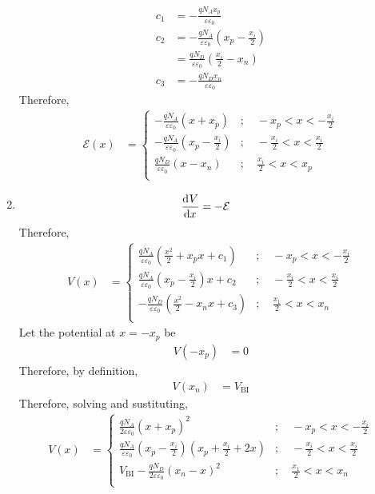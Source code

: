 \documentclass[titlepage, fleqn, a4paper, 12pt, twoside]{article}
\theoremstyle{definition}
\theoremstyle{theorem}
\begin{document}
\begin{solution}
\begin{enumerate}[leftmargin=*]
\begin{align*}
				c_1 &= -\frac{q N_A x_p}{\varepsilon \varepsilon_0}\\
				c_2 &= -\frac{q N_A}{\varepsilon \varepsilon_0} \left( x_p - \frac{x_i}{2} \right)\\
				&= \frac{q N_D}{\varepsilon \varepsilon_0} \left( \frac{x_i}{2} - x_n \right)\\
				c_3 &= -\frac{q N_D x_n}{\varepsilon \varepsilon_0}
			\end{align*}
			Therefore,
			\begin{align*}
				\mathcal{E}(x) &=
					\begin{cases}
						-\frac{q N_A}{\varepsilon \varepsilon_0} (x + x_p) &;\quad -x_p < x < -\frac{x_i}{2}\\
						-\frac{q N_A}{\varepsilon \varepsilon_0} \left( x_p - \frac{x_i}{2} \right) &;\quad -\frac{x_i}{2} < x < \frac{x_i}{2}\\
						\frac{q N_D}{\varepsilon \varepsilon_0} (x - x_n) &;\quad \frac{x_i}{2} < x < x_p\\
					\end{cases}
			\end{align*}
		\item
			\begin{align*}
				\dod{V}{x} &= -\mathcal{E}
			\end{align*}
			Therefore,
			\begin{align*}
				V(x) &=
					\begin{cases}
						\frac{q N_A}{\varepsilon \varepsilon_0} \left( \frac{x^2}{2} + x_p x + c_1 \right) &;\quad -x_p < x < -\frac{x_i}{2}\\
						\frac{q N_A}{\varepsilon \varepsilon_0} \left( x_p - \frac{x_i}{2} \right) x + c_2 &;\quad -\frac{x_i}{2} < x < \frac{x_i}{2}\\
						-\frac{q N_D}{\varepsilon \varepsilon_0} \left( \frac{x^2}{2} - x_n x + c_3 \right) &;\quad \frac{x_1}{2} < x < x_n\\
					\end{cases}
			\end{align*}
			Let the potential at $x = -x_p$ be
			\begin{align*}
				V(-x_p) &= 0
			\end{align*}
			Therefore, by definition,
			\begin{align*}
				V(x_n) &= V_{\text{BI}}
			\end{align*}
			Therefore, solving and sustituting,
			\begin{align*}
				V(x) &=
					\begin{cases}
						\frac{q N_A}{2 \varepsilon \varepsilon_0} (x + x_p)^2 &;\quad -x_p < x < -\frac{x_i}{2}\\
						\frac{q N_A}{\varepsilon \varepsilon_0} \left( x_p - \frac{x_i}{2} \right) \left( x_p + \frac{x_i}{2} + 2 x \right) &;\quad -\frac{x_i}{2} < x < \frac{x_i}{2}\\
						V_{\text{BI}} - \frac{q N_D}{2 \varepsilon \varepsilon_0} (x_n - x)^2 &;\quad \frac{x_1}{2} < x < x_n\\
					\end{cases}
			\end{align*}
	\end{enumerate}
\end{solution}
\end{document}
